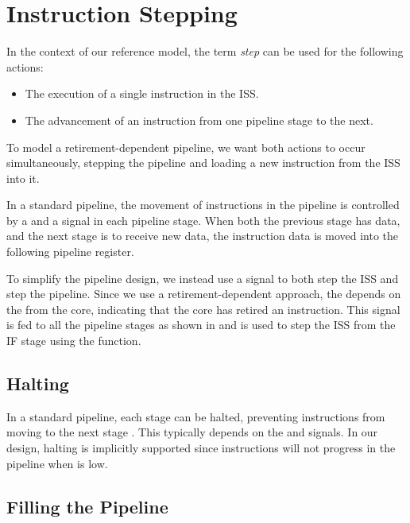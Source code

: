 \section{Instruction Stepping}%

In the context of our reference model, the term \textit{step} can be used for the following actions: 
\begin{itemize}
    \item The execution of a single instruction in the ISS.
    \item The advancement of an instruction from one pipeline stage to the next.
\end{itemize}

To model a retirement-dependent pipeline, we want both actions to occur simultaneously, stepping the pipeline and loading a new instruction from the ISS into it.

In a standard pipeline, the movement of instructions in the pipeline is controlled by a  and a  signal in each pipeline stage. When both the previous stage has  data, and the next stage is  to receive new data, the instruction data is moved into the following pipeline register.

To simplify the pipeline design, we instead use a  signal to both step the ISS and step the pipeline.
Since we use a retirement-dependent approach, the  depends on the  from the core, indicating that the core has retired an instruction. This signal is fed to all the pipeline stages as shown in  and is used to step the ISS from the IF stage using the  function.

\subsection{Halting}

In a standard pipeline, each stage can be halted, preventing instructions from moving to the next stage \cite{pattersonComputerOrganizationDesign2021}. This typically depends on the  and  signals. In our design, halting is implicitly supported since instructions will not progress in the pipeline when  is low.

\subsection{Filling the Pipeline}

